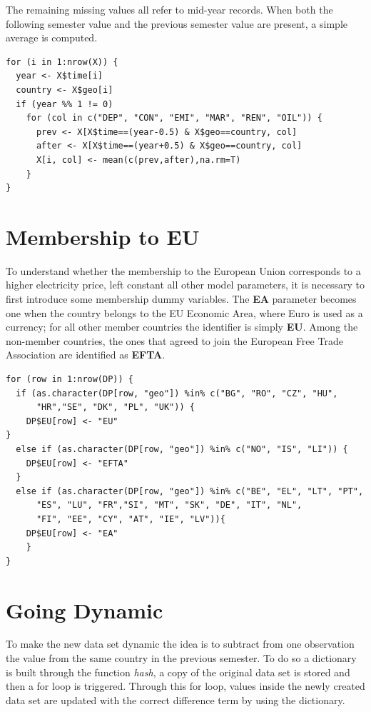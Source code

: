 \documentclass[a4paper,12pt]{book}
\begin{document}
\begin{appendices}
The remaining missing values all refer to mid-year records. When both the following semester value and the previous semester value are present, a simple average is computed.

\begin{verbatim}
for (i in 1:nrow(X)) {
  year <- X$time[i]
  country <- X$geo[i]
  if (year %% 1 != 0)
    for (col in c("DEP", "CON", "EMI", "MAR", "REN", "OIL")) {
      prev <- X[X$time==(year-0.5) & X$geo==country, col]
      after <- X[X$time==(year+0.5) & X$geo==country, col]
      X[i, col] <- mean(c(prev,after),na.rm=T)
    }
}
\end{verbatim}

\section*{Membership to EU}

To understand whether the membership to the European Union corresponds to a higher electricity price, left constant all other model parameters, it is necessary to first introduce some membership dummy variables. The \textbf{EA} parameter becomes one when the country belongs to the EU Economic Area, where Euro is used as a currency; for all other member countries the identifier is simply \textbf{EU}. Among the non-member countries, the ones that agreed to join the European Free Trade Association are identified as \textbf{EFTA}.

\begin{verbatim}
for (row in 1:nrow(DP)) {
  if (as.character(DP[row, "geo"]) %in% c("BG", "RO", "CZ", "HU",
	  "HR","SE", "DK", "PL", "UK")) {
    DP$EU[row] <- "EU"
}
  else if (as.character(DP[row, "geo"]) %in% c("NO", "IS", "LI")) {
    DP$EU[row] <- "EFTA"
  }
  else if (as.character(DP[row, "geo"]) %in% c("BE", "EL", "LT", "PT",
	  "ES", "LU", "FR","SI", "MT", "SK", "DE", "IT", "NL",
	  "FI", "EE", "CY", "AT", "IE", "LV")){
    DP$EU[row] <- "EA"
    }
}
\end{verbatim}

\section*{Going Dynamic}

To make the new data set dynamic the idea is to subtract from one observation the value from the same country in the previous semester. To do so a dictionary is built through the function \textit{hash}, a copy of the original data set is stored and then a for loop is triggered. Through this for loop, values inside the newly created data set are updated with the correct difference term by using the dictionary.


\end{appendices}
\end{document}
